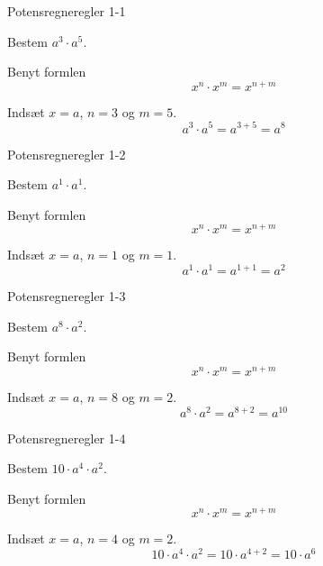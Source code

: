 \documentclass{article}
\begin{document}
\tableofcontents
\newpage

\begin{exercise}{Potensregneregler 1-1}

Bestem $a^3 \cdot a^5$.


\hint

Benyt formlen
\[
x^n \cdot x^m = x^{n + m}
\]

\hint

Indsæt $x=a$, $n=3$ og $m=5$.
\[
a^3 \cdot a^5 = a^{3 + 5} = a^8
\]

\end{exercise}

\newpage

\begin{exercise}{Potensregneregler 1-2}

Bestem $a^1 \cdot a^1$.


\hint

Benyt formlen
\[
x^n \cdot x^m = x^{n + m}
\]

\hint

Indsæt $x=a$, $n=1$ og $m=1$.
\[
a^1 \cdot a^1 = a^{1 + 1} = a^2
\]

\end{exercise}

\newpage

\begin{exercise}{Potensregneregler 1-3}

Bestem $a^8 \cdot a^2$.


\hint

Benyt formlen
\[
x^n \cdot x^m = x^{n + m}
\]

\hint

Indsæt $x=a$, $n=8$ og $m=2$.
\[
a^8 \cdot a^2 = a^{8 + 2} = a^{10}
\]

\end{exercise}

\newpage

\begin{exercise}{Potensregneregler 1-4}

Bestem $10 \cdot a^4 \cdot a^2$.


\hint

Benyt formlen
\[
x^n \cdot x^m = x^{n + m}
\]

\hint

Indsæt $x=a$, $n=4$ og $m=2$.
\[
10 \cdot a^4 \cdot a^2 = 10 \cdot a^{4 + 2} = 10 \cdot a^6
\]

\end{exercise}
\end{document}
